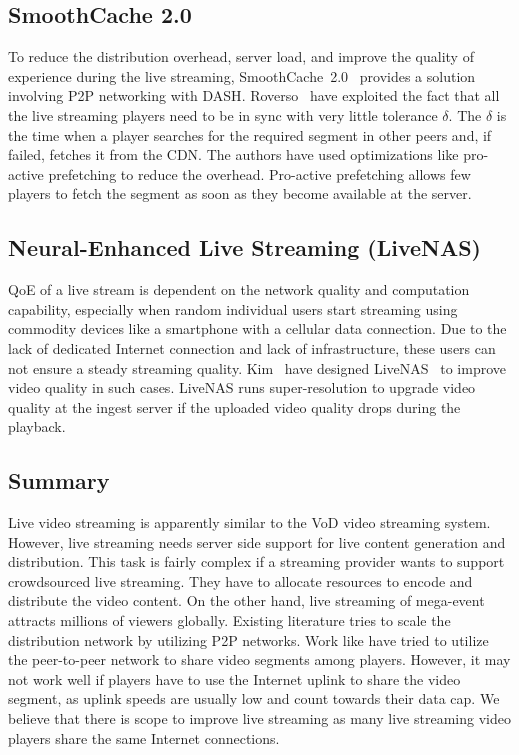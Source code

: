 \subsection{SmoothCache 2.0}
To reduce the distribution overhead, server load, and improve the quality of experience during the live streaming, SmoothCache~2.0~\cite{10.1145/2713168.2713182} provides a solution involving \ac{P2P} networking with \ac{DASH}. Roverso \etal\ have exploited the fact that all the live streaming players need to be in sync with very little tolerance $\delta$. The $\delta$ is the time when a player searches for the required segment in other peers and, if failed, fetches it from the \ac{CDN}. The authors have used optimizations like pro-active prefetching to reduce the overhead. Pro-active prefetching allows few players to fetch the segment as soon as they become available at the server.

\subsection{Neural-Enhanced Live Streaming (LiveNAS)}
\Ac{QoE} of a live stream is dependent on the network quality and computation capability, especially when random individual users start streaming using commodity devices like a smartphone with a cellular data connection. Due to the lack of dedicated Internet connection and lack of infrastructure, these users can not ensure a steady streaming quality. Kim \etal\ have designed LiveNAS~\cite{10.1145/3387514.3405856} to improve video quality in such cases. LiveNAS runs super-resolution to upgrade video quality at the ingest server if the uploaded video quality drops during the playback.

\subsection{Summary}
Live video streaming is apparently similar to the \ac{VoD} video streaming system. However, live streaming needs server side support for live content generation and distribution. This task is fairly complex if a streaming provider wants to support crowdsourced live streaming. They have to allocate resources to encode and distribute the video content. On the other hand, live streaming of mega-event attracts millions of viewers globally. Existing literature tries to scale the distribution network by utilizing \ac{P2P} networks. Work like \cite{10.1145/2713168.2713182} have tried to utilize the peer-to-peer network to share video segments among players. However, it may not work well if players have to use the Internet uplink to share the video segment, as uplink speeds are usually low and count towards their data cap. We believe that there is scope to improve live streaming as many live streaming video players share the same Internet connections.